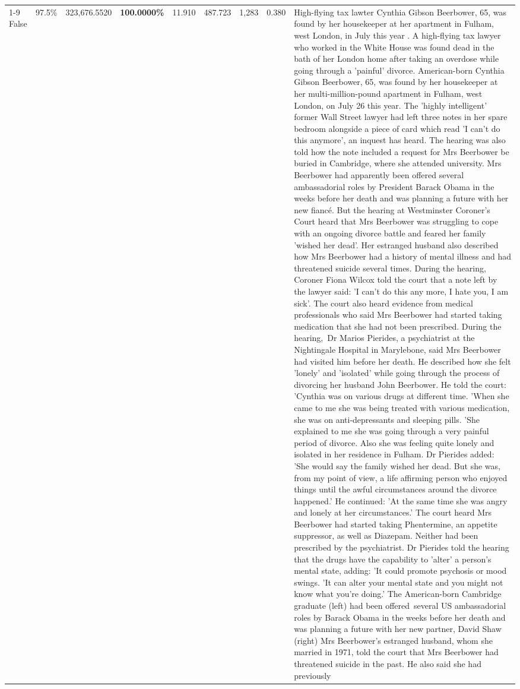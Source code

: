 \begin{table}[H]
\begin{tabular}{lllrlllll}
\cline{1-9}
False & 97.5\% & 323,676.5520 & \bfseries \color{red} 100.0000\% & 11.910 & 487.723 & 1,283 & 0.380 & High-flying tax lawter Cynthia Gibson Beerbower, 65, was found by her housekeeper at her apartment in Fulham, west London, in July this year . A high-flying tax lawyer who worked in the White House was found dead in the bath of her London home after taking an overdose while going through a 'painful' divorce. American-born Cynthia Gibson Beerbower, 65, was found by her housekeeper at her multi-million-pound apartment in Fulham, west London, on July 26 this year. The 'highly intelligent' former Wall Street lawyer had left three notes in her spare bedroom alongside a piece of card which read 'I can't do this anymore', an inquest has heard. The hearing was also told how the note included a request for Mrs Beerbower be buried in Cambridge, where she attended university. Mrs Beerbower had apparently been offered several ambassadorial roles by President Barack Obama in the weeks before her death and was planning a future with her new fiancé. But the hearing at Westminster Coroner's Court heard that Mrs Beerbower was struggling to cope with an ongoing divorce battle and feared her family 'wished her dead'. Her estranged husband also described how Mrs Beerbower had a history of mental illness and had threatened suicide several times. During the hearing, Coroner Fiona Wilcox told the court that a note left by the lawyer said: 'I can't do this any more, I hate you, I am sick'. The court also heard evidence from medical professionals who said Mrs Beerbower had started taking medication that she had not been prescribed. During the hearing, Dr Marios Pierides, a psychiatrist at the Nightingale Hospital in Marylebone, said Mrs Beerbower had visited him before her death. He described how she felt 'lonely' and 'isolated' while going through the process of divorcing her husband John Beerbower. He told the court: 'Cynthia was on various drugs at different time. 'When she came to me she was being treated with various medication, she was on anti-depressants and sleeping pills. 'She explained to me she was going through a very painful period of divorce. Also she was feeling quite lonely and isolated in her residence in Fulham. Dr Pierides added: 'She would say the family wished her dead. But she was, from my point of view, a life affirming person who enjoyed things until the awful circumstances around the divorce happened.' He continued: 'At the same time she was angry and lonely at her circumstances.' The court heard Mrs Beerbower had started taking Phentermine, an appetite suppressor, as well as Diazepam. Neither had been prescribed by the psychiatrist. Dr Pierides told the hearing that the drugs have the capability to 'alter' a person's mental state, adding: 'It could promote psychosis or mood swings. 'It can alter your mental state and you might not know what you're doing.' The American-born Cambridge graduate (left) had been offered several US ambassadorial roles by Barack Obama in the weeks before her death and was planning a future with her new partner, David Shaw (right) Mrs Beerbower's estranged husband, whom she married in 1971, told the court that Mrs Beerbower had threatened suicide in the past. He also said she had previously 
\end{tabular}
\end{table}
